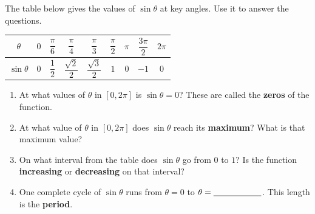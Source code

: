 \documentclass[10pt]{article}
\begin{document}
\namepartnerperiod

\vspace{0.1in}

\begin{tcolorbox}[colback=white, colframe=black!40,
    title=\textbf{Tier R --- Remediate},
    fonttitle=\bfseries, arc=2mm, left=3mm, right=3mm, top=2mm, bottom=2mm]

The table below gives the values of $\sin\theta$ at key angles. Use it to answer the
questions.

\vspace{6pt}
\renewcommand{\arraystretch}{1.5}
\begin{tabular}{@{}|c|c|c|c|c|c|c|c|c|@{}}
    \hline
    $\theta$ & $0$ & $\dfrac{\pi}{6}$ & $\dfrac{\pi}{4}$ & $\dfrac{\pi}{3}$ &
               $\dfrac{\pi}{2}$ & $\pi$ & $\dfrac{3\pi}{2}$ & $2\pi$ \\\hline
    $\sin\theta$ & $0$ & $\dfrac{1}{2}$ & $\dfrac{\sqrt{2}}{2}$ & $\dfrac{\sqrt{3}}{2}$ &
                   $1$ & $0$ & $-1$ & $0$ \\\hline
\end{tabular}

\begin{enumerate}[leftmargin=1.5em, itemsep=10pt]
    \item At what values of $\theta$ in $[0, 2\pi]$ is $\sin\theta = 0$?
          These are called the \textbf{zeros} of the function.

          \blank{8cm}

    \item At what value of $\theta$ in $[0, 2\pi]$ does $\sin\theta$ reach its
          \textbf{maximum}? What is that maximum value?

          \blank{8cm}

    \item On what interval from the table does $\sin\theta$ go from $0$ to $1$? Is the
          function \textbf{increasing} or \textbf{decreasing} on that interval?

          \blank{8cm}

    \item One complete cycle of $\sin\theta$ runs from $\theta=0$ to $\theta=\blank{2cm}$.
          This length is the \textbf{period}.
\end{enumerate}
\end{tcolorbox}

\vspace{0.1in}
\end{document}
